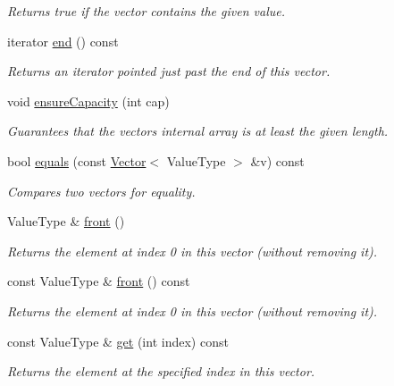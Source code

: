 \begin{DoxyCompactItemize}
\begin{DoxyCompactList}\small\item\em Returns true if the vector contains the given value. \end{DoxyCompactList}\item 
iterator \mbox{\hyperlink{classVector_a68b688a51bd0cf6fb5bc2cba292209a8}{end}} () const
\begin{DoxyCompactList}\small\item\em Returns an iterator pointed just past the end of this vector. \end{DoxyCompactList}\item 
void \mbox{\hyperlink{classVector_a9552fd9e921fc047fdd59e59d82e88ef}{ensure\+Capacity}} (int cap)
\begin{DoxyCompactList}\small\item\em Guarantees that the vector\textquotesingle{}s internal array is at least the given length. \end{DoxyCompactList}\item 
bool \mbox{\hyperlink{classVector_ad25fe1a007a2f00611d831198a1a86ea}{equals}} (const \mbox{\hyperlink{classVector}{Vector}}$<$ Value\+Type $>$ \&v) const
\begin{DoxyCompactList}\small\item\em Compares two vectors for equality. \end{DoxyCompactList}\item 
Value\+Type \& \mbox{\hyperlink{classVector_a736a6bda35a26620407e175bee46ae4a}{front}} ()
\begin{DoxyCompactList}\small\item\em Returns the element at index 0 in this vector (without removing it). \end{DoxyCompactList}\item 
const Value\+Type \& \mbox{\hyperlink{classVector_a02aaa52ad7a120201f6dd3e90eff737f}{front}} () const
\begin{DoxyCompactList}\small\item\em Returns the element at index 0 in this vector (without removing it). \end{DoxyCompactList}\item 
const Value\+Type \& \mbox{\hyperlink{classVector_adcb38df411d14f0bd9c14e23947d2e1c}{get}} (int index) const
\begin{DoxyCompactList}\small\item\em Returns the element at the specified index in this vector. \end{DoxyCompactList}\item 

\end{DoxyCompactItemize}
